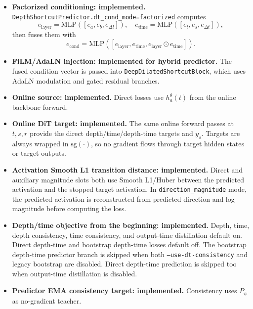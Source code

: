 \documentclass[11pt]{article}
\begin{document}
\begin{itemize}[leftmargin=*]
  \item \textbf{Factorized conditioning: implemented.}
  \texttt{DepthShortcutPredictor.dt\_cond\_mode=factorized} computes
  \[
  e_{\mathrm{layer}}=\mathrm{MLP}([e_a,e_b,e_{\Delta l}]),\quad
  e_{\mathrm{time}}=\mathrm{MLP}([e_t,e_s,e_{\Delta t}]),
  \]
  then fuses them with
  \[
  e_{\mathrm{cond}}=\mathrm{MLP}([e_{\mathrm{layer}},e_{\mathrm{time}},e_{\mathrm{layer}}\odot e_{\mathrm{time}}]).
  \]

  \item \textbf{FiLM/AdaLN injection: implemented for hybrid predictor.}
  The fused condition vector is passed into \texttt{DeepDilatedShortcutBlock},
  which uses AdaLN modulation and gated residual branches.

  \item \textbf{Online source: implemented.}
  Direct losses use $h_a^\theta(t)$ from the online backbone forward.

  \item \textbf{Online DiT target: implemented.}
  The same online forward passes at $t,s,r$ provide the direct depth/time/depth-time
  targets and $y_s$. Targets are always wrapped in \(\mathrm{sg}(\cdot)\), so no
  gradient flows through target hidden states or target outputs.

  \item \textbf{Activation Smooth L1 transition distance: implemented.}
  Direct and auxiliary magnitude slots both use Smooth L1/Huber between the
  predicted activation and the stopped target activation. In
  \texttt{direction\_magnitude} mode, the predicted activation is reconstructed
  from predicted direction and log-magnitude before computing the loss.

  \item \textbf{Depth/time objective from the beginning: implemented.}
  Depth, time, depth consistency, time consistency, and output-time distillation
  default on. Direct depth-time and bootstrap depth-time losses default off.
  The bootstrap depth-time predictor branch is skipped when both
  \texttt{--use-dt-consistency} and legacy bootstrap are disabled. Direct
  depth-time prediction is skipped too when output-time distillation is disabled.

  \item \textbf{Predictor EMA consistency target: implemented.}
  Consistency uses $P_{\bar\psi}$ as no-gradient teacher.
\end{itemize}
\end{document}
